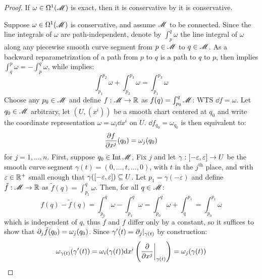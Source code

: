 \begin{proofbox}
  \begin{proof}
    If $ \omega \in \Omega^{1}(\mathscr{M}) $ is exact, then it is conservative by  it is conservative.

    Suppose $ \omega \in \Omega^{1}(\mathscr{M}) $ is conservative, and assume $ \mathscr{M} $ to be connected. Since the line integrals of $ \omega $ are path-independent, denote by $ \int_p^q \omega $ the line integral of $ \omega $ along any piecewise smooth curve segment from $ p \in \mathscr{M} $ to $ q \in \mathscr{M} $. As a backward reparametrization of a path from $ p $ to $ q $ is a path to $ q $ to $ p $, then  implies $ \int_q^p \omega = - \int_p^q \omega $, while  implies:
    \begin{equation*}
      \int_{p_1}^{p_2} \omega + \int_{p_2}^{p_3} \omega = \int_{p_1}^{p_3} \omega
    \end{equation*}
    Choose any $ p_0 \in \mathscr{M} $ and define $ f : \mathscr{M} \rightarrow \mathbb{R} $ as $ f(q) = \int_{p_0}^q \mathscr{M} $: WTS $ \dd f = \omega $. Let $ q_0 \in \mathscr{M} $ arbitrary, let $ (U,(x^i)) $ be a smooth chart centered at $ q_0 $ and write the coordinate representation $ \omega = \omega_i \dd x^i $ on $ U $. $ \dd f_{q_0} = \omega_{q_0} $ is then equivalent to:
    \begin{equation*}
      \frac{\partial f}{\partial x^j}(q_0) = \omega_j(q_0)
    \end{equation*}
    for $ j = 1 , \dots , n $. First, suppose $ q_0 \in \operatorname{Int} \mathscr{M} $, Fix $ j $ and let $ \gamma : [-\varepsilon , \varepsilon] \rightarrow U $ be the smooth curve segment $ \gamma(t) = (0, \dots , t , \dots , 0) $, with $ t $ in the $ j^\text{th} $ place, and with $ \varepsilon \in \mathbb{R}^+ $ small enough that $ \gamma([-\varepsilon , \varepsilon]) \subseteq U $. Let $ p_1 = \gamma(-\varepsilon) $ and define $ \tilde{f} : \mathscr{M} \rightarrow \mathbb{R} $ as $ \tilde{f}(q) = \int_{p_1}^q \omega $. Then, for all $ q \in \mathscr{M} $:
    \begin{equation*}
      f(q) - \tilde{f}(q) = \int_{p_0}^q \omega - \int_{p_1}^q \omega = \int_{p_0}^q \omega + \int_q^{p_1} = \int_{p_0}^{p_1} \omega
    \end{equation*}
    which is independent of $ q $, thus $ \tilde{f} $ and $ f $ differ only by a constant, so it suffices to show that $ \partial_j \tilde{f}(q_0) = \omega_j(q_0) $. Since $ \gamma'(t) = \partial_j \vert_{\gamma(t)} $ by construction:
    \begin{equation*}
      \omega_{\gamma(t)}(\gamma'(t)) = \omega_i(\gamma(t)) \dd x^i \left( \frac{\pa}{\pa x^j} \bigg\vert_{\gamma(t)} \right) = \omega_j(\gamma(t))

\end{equation*}
\end{proof}
\end{proofbox}
